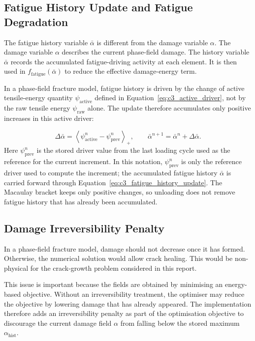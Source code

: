 \subsection{Fatigue History Update and Fatigue Degradation}
\label{subsec:c3_fatigue_history}

The fatigue history variable $\bar{\alpha}$ is different from the damage variable $\alpha$. The damage variable $\alpha$ describes the current phase-field damage. The history variable $\bar{\alpha}$ records the accumulated fatigue-driving activity at each element. It is then used in $f_{\mathrm{fatigue}}(\bar{\alpha})$ to reduce the effective damage-energy term.

In a phase-field fracture model, fatigue history is driven by the change of active tensile-energy quantity $\psi_{\mathrm{active}}$ defined in Equation~\ref{eq:c3_active_driver}, not by the raw tensile energy $\psi_{\mathrm{raw}}$ alone. The update therefore accumulates only positive increases in this active driver:

\begin{equation}
    \Delta \bar{\alpha}
    =
    \left\langle
    \psi_{\mathrm{active}}^{n}
    -
    \psi_{\mathrm{prev}}^{n}
    \right\rangle_+,
    \qquad
    \bar{\alpha}^{n+1}
    =
    \bar{\alpha}^{n}
    +
    \Delta \bar{\alpha} .
    \label{eq:c3_fatigue_history_update}
\end{equation}
Here $\psi_{\mathrm{prev}}^{n}$ is the stored driver value from the last loading cycle used as the reference for the current increment. In this notation, $\psi_{\mathrm{prev}}^{n}$ is only the reference driver used to compute the increment; the accumulated fatigue history $\bar{\alpha}$ is carried forward through Equation~\ref{eq:c3_fatigue_history_update}. The Macaulay bracket keeps only positive changes, so unloading does not remove fatigue history that has already been accumulated.

\subsection{Damage Irreversibility Penalty}
\label{subsec:c3_irreversibility_treatment}

In a phase-field fracture model, damage should not decrease once it has formed. Otherwise, the numerical solution would allow crack healing. This would be non-physical for the crack-growth problem considered in this report.

This issue is important because the fields are obtained by minimising an energy-based objective. Without an irreversibility treatment, the optimiser may reduce the objective by lowering damage that has already appeared. The implementation therefore adds an irreversibility penalty as part of the optimisation objective to discourage the current damage field $\alpha$ from falling below the stored maximum $\alpha_{\mathrm{hist}}$.

